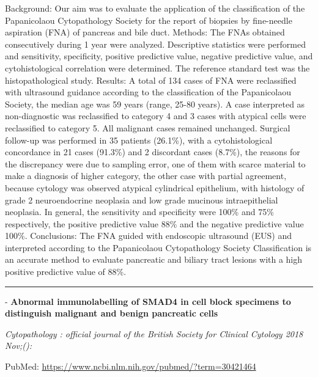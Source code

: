 \documentclass[]{article}
\begin{document}
Background: Our aim was to evaluate the application of the
classification of the Papanicolaou Cytopathology Society for the report
of biopsies by fine-needle aspiration (FNA) of pancreas and bile duct.
Methods: The FNAs obtained consecutively during 1 year were analyzed.
Descriptive statistics were performed and sensitivity, specificity,
positive predictive value, negative predictive value, and
cytohistological correlation were determined. The reference standard
test was the histopathological study. Results: A total of 134 cases of
FNA were reclassified with ultrasound guidance according to the
classification of the Papanicolaou Society, the median age was 59 years
(range, 25-80 years). A case interpreted as non-diagnostic was
reclassified to category 4 and 3 cases with atypical cells were
reclassified to category 5. All malignant cases remained unchanged.
Surgical follow-up was performed in 35 patients (26.1\%), with a
cytohistological concordance in 21 cases (91.3\%) and 2 discordant cases
(8.7\%), the reasons for the discrepancy were due to sampling error, one
of them with scarce material to make a diagnosis of higher category, the
other case with partial agreement, because cytology was observed
atypical cylindrical epithelium, with histology of grade 2
neuroendocrine neoplasia and low grade mucinous intraepithelial
neoplasia. In general, the sensitivity and specificity were 100\% and
75\% respectively, the positive predictive value 88\% and the negative
predictive value 100\%. Conclusions: The FNA guided with endoscopic
ultrasound (EUS) and interpreted according to the Papanicolaou
Cytopathology Society Classification is an accurate method to evaluate
pancreatic and biliary tract lesions with a high positive predictive
value of 88\%.

{}

{}

\begin{center}\rule{0.5\linewidth}{\linethickness}\end{center}

 - \textbf{Abnormal immunolabelling of SMAD4 in cell block specimens to
distinguish malignant and benign pancreatic cells}

\emph{Cytopathology : official journal of the British Society for
Clinical Cytology 2018 Nov;():}

PubMed: \url{https://www.ncbi.nlm.nih.gov/pubmed/?term=30421464}
\end{document}
